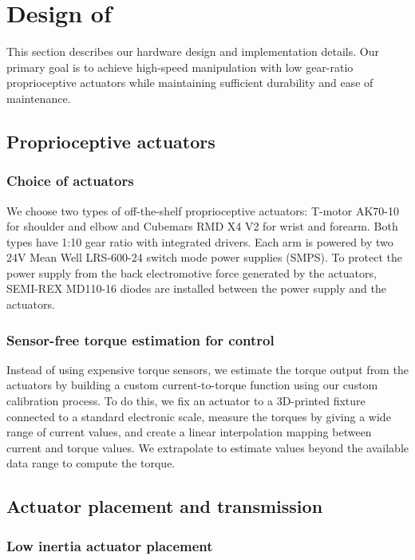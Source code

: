 \section{Design of \robot}

This section describes our hardware design and implementation details. Our primary goal is to achieve high-speed manipulation with low gear-ratio proprioceptive actuators while maintaining sufficient durability and ease of maintenance.

\subsection{Proprioceptive actuators}

\subsubsection{Choice of actuators}
We choose two types of off-the-shelf proprioceptive actuators: T-motor AK70-10 for shoulder and elbow and Cubemars RMD X4 V2 for wrist and forearm. Both types have 1:10 gear ratio with integrated drivers. Each arm is powered by two 24V Mean Well LRS-600-24 switch mode power supplies (SMPS). To protect the power supply from the back electromotive force generated by the actuators, SEMI-REX MD110-16 diodes are installed between the power supply and the actuators. 

\subsubsection{Sensor-free torque estimation for control}
Instead of using expensive torque sensors, we estimate the torque output from the actuators by building a custom current-to-torque function using our custom calibration process. To do this, we fix an actuator to a 3D-printed fixture connected to a standard electronic scale, measure the torques by giving a wide range of current values, and create a linear interpolation mapping between current and torque values. We extrapolate to estimate values beyond the available data range to compute the torque.

\subsection{Actuator placement and transmission}

\subsubsection{Low inertia actuator placement}

